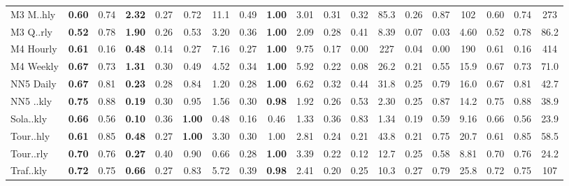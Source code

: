 \begin{tabular}{l|ccc|ccc|ccc|ccc|ccc||ccc}
        M3 M..hly & \textbf{0.60} & 0.74 & \textbf{2.32} & 0.27 & 0.72 & 11.1 & 0.49 & \textbf{1.00} & 3.01 & 0.31 & 0.32 & 85.3 & 0.26 & 0.87 & 102 & 0.60 & 0.74 & 273 \\
        M3 Q..rly & \textbf{0.52} & 0.78 & \textbf{1.90} & 0.26 & 0.53 & 3.20 & 0.36 & \textbf{1.00} & 2.09 & 0.28 & 0.41 & 8.39 & 0.07 & 0.03 & 4.60 & 0.52 & 0.78 & 86.2 \\
        M4 Hourly & \textbf{0.61} & 0.16 & \textbf{0.48} & 0.14 & 0.27 & 7.16 & 0.27 & \textbf{1.00} & 9.75 & 0.17 & 0.00 & 227 & 0.04 & 0.00 & 190 & 0.61 & 0.16 & 414 \\
        M4 Weekly & \textbf{0.67} & 0.73 & \textbf{1.31} & 0.30 & 0.49 & 4.52 & 0.34 & \textbf{1.00} & 5.92 & 0.22 & 0.08 & 26.2 & 0.21 & 0.55 & 15.9 & 0.67 & 0.73 & 71.0 \\
        NN5 Daily & \textbf{0.67} & 0.81 & \textbf{0.23} & 0.28 & 0.84 & 1.20 & 0.28 & \textbf{1.00} & 6.62 & 0.32 & 0.44 & 31.8 & 0.25 & 0.79 & 16.0 & 0.67 & 0.81 & 42.7 \\
        NN5 ..kly & \textbf{0.75} & 0.88 & \textbf{0.19} & 0.30 & 0.95 & 1.56 & 0.30 & \textbf{0.98} & 1.92 & 0.26 & 0.53 & 2.30 & 0.25 & 0.87 & 14.2 & 0.75 & 0.88 & 38.9 \\
        Sola..kly & \textbf{0.66} & 0.56 & \textbf{0.10} & 0.36 & \textbf{1.00} & 0.48 & 0.16 & 0.46 & 1.33 & 0.36 & 0.83 & 1.34 & 0.19 & 0.59 & 9.16 & 0.66 & 0.56 & 23.9 \\
        Tour..hly & \textbf{0.61} & 0.85 & \textbf{0.48} & 0.27 & \textbf{1.00} & 3.30 & 0.30 & 1.00 & 2.81 & 0.24 & 0.21 & 43.8 & 0.21 & 0.75 & 20.7 & 0.61 & 0.85 & 58.5 \\
        Tour..rly & \textbf{0.70} & 0.76 & \textbf{0.27} & 0.40 & 0.90 & 0.66 & 0.28 & \textbf{1.00} & 3.39 & 0.22 & 0.12 & 12.7 & 0.25 & 0.58 & 8.81 & 0.70 & 0.76 & 24.2 \\
        Traf..kly & \textbf{0.72} & 0.75 & \textbf{0.66} & 0.27 & 0.83 & 5.72 & 0.39 & \textbf{0.98} & 2.41 & 0.20 & 0.25 & 10.3 & 0.27 & 0.79 & 25.8 & 0.72 & 0.75 & 107 \\
        \bottomrule
    \end{tabular}